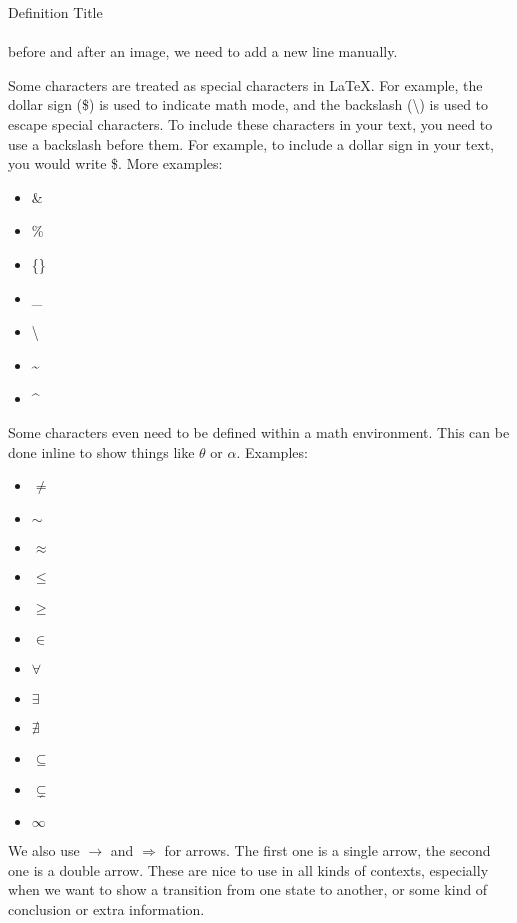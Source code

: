 \begin{definition}{Definition Title}
    \\
    \\
    before and after an image, we need to add a new line manually. 
\end{definition}

\begin{remark}
    Some characters are treated as special characters in LaTeX. For example, the dollar sign (\$) is used to indicate math mode, and the backslash (\textbackslash) is used to escape special characters. 
    To include these characters in your text, you need to use a backslash before them. 
    For example, to include a dollar sign in your text, you would write \$.
    More examples:
    \begin{itemize}
        \item \&
        \item \%
        \item \{\}
        \item \_
        \item \textbackslash
        \item \textasciitilde
        \item \textasciicircum
    \end{itemize}
\end{remark}

\begin{remark}
    Some characters even need to be defined within a math environment. This can be done inline to show things like $\theta$ or $\alpha$.
    Examples:
    \begin{itemize}
        \item $\neq$
        \item $\sim$
        \item $\approx$
        \item $\leq$
        \item $\geq$
        \item $\in$
        \item $\forall$
        \item $\exists$
        \item $\nexists$
        \item $\subseteq$
        \item $\subsetneq$
        \item $\infty$
    \end{itemize}

    We also use $\rightarrow$ and $\Rightarrow$ for arrows. The first one is a single arrow, the second one is a double arrow.
    These are nice to use in all kinds of contexts, especially when we want to show a transition from one state to another, or some kind of conclusion or extra information.
\end{remark}

